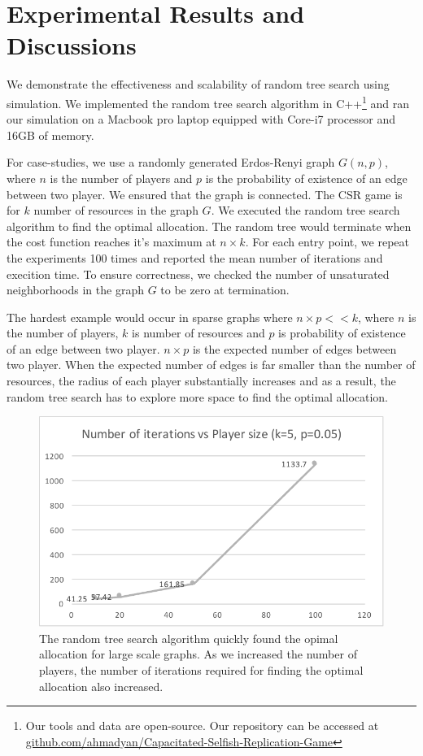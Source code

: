 \section{Experimental Results and Discussions}\label{sec:results}
We demonstrate the effectiveness and scalability of random tree search using simulation.
We implemented the random tree search algorithm in C++\footnote{Our tools and data are open-source. Our repository can be accessed at \url{github.com/ahmadyan/Capacitated-Selfish-Replication-Game}} and ran our simulation on a Macbook pro laptop equipped with Core-i7 processor and 16GB of memory.

For case-studies, we use a randomly generated Erdos-Renyi graph $G(n,p)$, where $n$ is the number of players and $p$ is the probability of existence of an edge between two player. We ensured that the graph is connected. The CSR game is for $k$ number of resources in the graph $G$. We executed the random tree search algorithm to find the optimal allocation. The random tree would terminate when the cost function reaches it's maximum at $n\times k$. For each entry point, we repeat the experiments 100 times and reported the mean number of iterations and execition time. To ensure correctness, we checked the number of unsaturated neighborhoods in the graph $G$ to be zero at termination.


The hardest example would occur in sparse graphs where $n\times p << k$, where $n$ is the number of players, $k$ is number of resources and $p$ is probability of existence of an edge between two player. $n\times p$ is the expected number of edges between two player. When the expected number of edges is far smaller than the number of resources, the radius of each player substantially increases and as a result, the random tree search has to explore more space to find the optimal allocation.



\begin{figure}[htb]
\begin{center}
\includegraphics[width=.4\textwidth]{result-1}
\end{center}
\caption{The random tree search algorithm quickly found the opimal allocation for large scale graphs. As we increased the number of players, the number of iterations required for finding the optimal allocation also increased.}
\label{fig:result1}
\end{figure}

